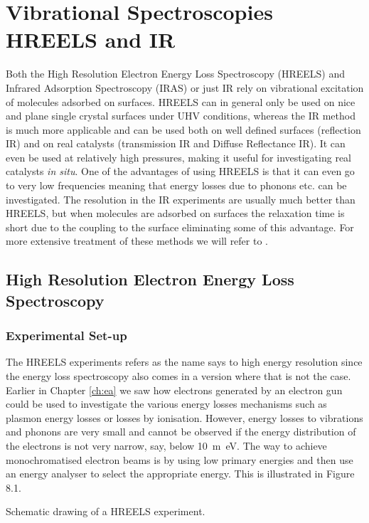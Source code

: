 \newpage
\chapter{Vibrational Spectroscopies HREELS and IR}
Both the High Resolution Electron Energy Loss Spectroscopy (HREELS) and Infrared Adsorption Spectroscopy (IRAS) or just IR  rely on vibrational excitation of molecules adsorbed on surfaces. HREELS can in general only be used on nice and plane single crystal surfaces under UHV conditions, whereas the IR method is much more applicable and can be used both on well defined surfaces (reflection IR) and on real catalysts (transmission IR and Diffuse Reflectance IR). It can even be used at relatively high pressures, making it useful for investigating real catalysts {\it in situ}. One of the advantages of using HREELS is that it can even go to very low frequencies meaning that energy losses due to phonons etc. can be investigated. The resolution in the IR experiments are usually much better than HREELS, but when molecules are adsorbed on surfaces the relaxation time is short due to the coupling  to the surface eliminating some of this advantage. For more extensive treatment of these methods we will refer to \cite{Ibach,Ertl,Zangwill}.

\section{High Resolution Electron Energy Loss Spectroscopy}
\subsection{Experimental Set-up}
The HREELS experiments refers as the name says to high energy resolution since the energy loss spectroscopy also comes in a version where that is not the case. Earlier in Chapter \ref{ch:ea} we saw how electrons generated by an electron gun could be used to investigate the various energy losses mechanisms such as plasmon energy losses or losses by ionisation. However, energy losses to vibrations and phonons are very small and cannot be observed if the energy distribution of the electrons is not very narrow, say, below \SI{10}{m\electronvolt}. The way to achieve monochromatised electron beams is by using low primary energies and then use an energy analyser to select the appropriate energy. This is illustrated in Figure 8.1.

\vspace*{11cm}

 Schematic drawing of a HREELS experiment.

